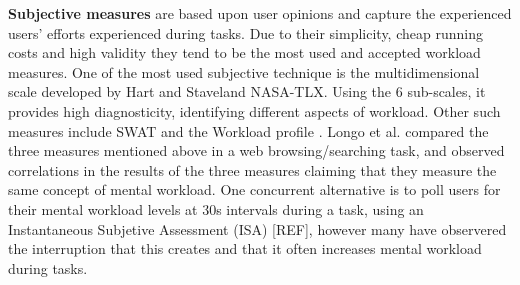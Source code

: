 \documentclass[../main/Feedback.tex]{subfiles}
\begin{document}
\textbf{Subjective measures} are based upon user opinions and capture the experienced users' efforts experienced during tasks.
Due to their simplicity, cheap running costs and high validity they tend to be the most used and accepted workload measures.
One of the most used subjective technique is the multidimensional scale developed by Hart and Staveland \cite{nasatlx} NASA-TLX.
Using the 6 sub-scales, it provides high diagnosticity, identifying different aspects of workload. Other such measures include SWAT \cite{reid1988subjective} and the Workload profile \cite{tsang1996diagnosticity}. Longo et al. \cite{longo2012importance} compared the three measures mentioned above in a web browsing/searching task, and observed correlations in the results of the three measures claiming that they measure the same concept of mental workload. One concurrent alternative is to poll users for their mental workload levels at 30s intervals during a task, using an Instantaneous Subjetive Assessment (ISA) [REF], however many have observered the interruption that this creates and that it often increases mental workload during tasks.

%
\end{document}
